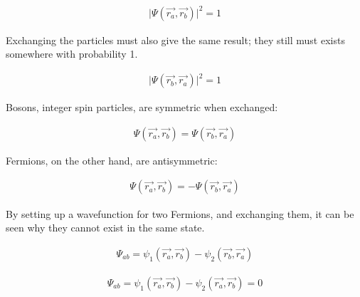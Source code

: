 \begin{equation}
  \begin{split}
    \lvert \Psi(\vec{r_a}, \vec{r_b}) \rvert ^2 = 1
  \end{split}
  \label{eq:eqEulersFormula}
\end{equation}

Exchanging the particles must also give the same result; they still must exists somewhere with probability 1.

\begin{equation}
  \begin{split}
    \lvert \Psi(\vec{r_b}, \vec{r_a}) \rvert ^2 = 1
  \end{split}
  \label{eq:eqEulersFormula}
\end{equation}

Bosons, integer spin particles, are symmetric when exchanged:

\begin{equation}
  \begin{split}
  \Psi(\vec{r_a}, \vec{r_b}) = \Psi(\vec{r_b}, \vec{r_a})
  \end{split}
  \label{eq:eqEulersFormula}
\end{equation}

Fermions, on the other hand, are antisymmetric:

\begin{equation}
  \begin{split}
  \Psi(\vec{r_a}, \vec{r_b}) = - \Psi(\vec{r_b}, \vec{r_a})
  \end{split}
  \label{eq:eqEulersFormula}
\end{equation}

By setting up a wavefunction for two Fermions, and exchanging them, it can be seen why they cannot exist in the same state.

\begin{equation}
  \begin{split}
  \Psi_{ab} =  \psi_{1}(\vec{r_a}, \vec{r_b}) - \psi_{2}(\vec{r_b}, \vec{r_a})
  \end{split}
  \label{eq:eqEulersFormula}
\end{equation}

\begin{equation}
  \begin{split}
  \Psi_{ab} =  \psi_{1}(\vec{r_a}, \vec{r_b}) - \psi_{2}(\vec{r_a}, \vec{r_b}) = 0
  \end{split}
  \label{eq:eqEulersFormula}
\end{equation}


